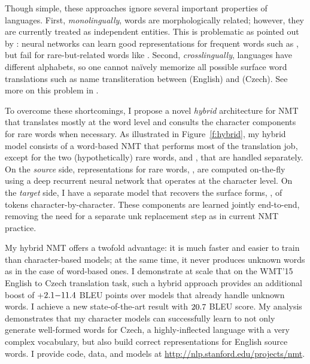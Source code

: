 Though simple, these approaches ignore several important
properties of languages. First, {\it monolingually}, words are morphologically
related; however, they are currently treated as independent entities. This is
problematic as pointed out by
: neural networks can learn good
representations for frequent words such as , but fail for
rare-but-related words like . Second, {\it crosslingually},
languages have different alphabets, so one cannot na\"{i}vely memorize all
possible surface word translations such as name transliteration between 
 (English) and  (Czech). See more on this problem
in \cite{sennrich16sub}.

To overcome these shortcomings, I propose a novel {\it hybrid} architecture for NMT
that translates mostly at the word level and consults the character
components for rare words when necessary. As illustrated in
Figure~\ref{f:hybrid}, my hybrid model consists of a word-based NMT that
performs most of the translation job, except for the two (hypothetically) rare words,
 and , that are handled separately. On the {\it source}
side, representations for rare words, , are
computed on-the-fly using a deep recurrent neural network that operates at the
character level. On the {\it target} side, I have a separate model that
recovers the surface forms, , of \unk{} tokens character-by-character.
These components are learned jointly end-to-end, removing the need for a separate
unk replacement step as in current NMT practice.

My hybrid NMT offers a twofold advantage: it is much faster and easier to
train than character-based models; at the same time, it never produces unknown
words as in the case of word-based ones.
I demonstrate at scale that on the WMT'15 English to
Czech translation task, such a hybrid approach provides
an additional boost of +$2.1{-}11.4{}$ BLEU points over models 
that already handle unknown words.
I achieve a new state-of-the-art result with
$20.7{}$ BLEU score.
My analysis demonstrates that my character models can successfully learn to not
only generate well-formed words for Czech, a
highly-inflected language with a very complex vocabulary, but also build correct
representations for English source words.
I provide code, data, and models at \url{http://nlp.stanford.edu/projects/nmt}.

